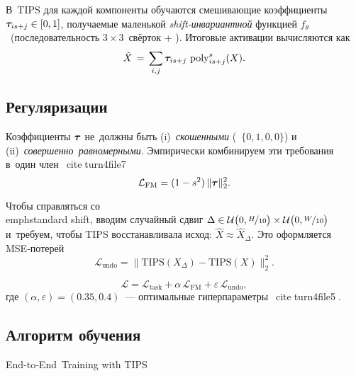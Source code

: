 В TIPS для каждой компоненты обучаются смешивающие коэффициенты
$\bm{\tau}_{is+j}\in[0,1]$, получаемые маленькой
\emph{shift‑инвариантной} функцией $f_{\theta}$ (последовательность
$3\times3$ свёрток + \relu).  Итоговые активации вычисляются как
\begin{equation}
  \hat X \,=\, \sum_{i,j} \bm{\tau}_{is+j}\,\operatorname{poly}_{i s + j}^{s}(X).\label{eq:tips_output}
\end{equation}

\subsection{Регуляризации}
Коэффициенты $\bm{\tau}$ не должны быть (i)~\emph{скошенными}
(\eg~$\{0,1,0,0\}$) и (ii)~\emph{совершенно равномерными}.  Эмпирически
комбинируем эти требования в один член citeturn4file7
\begin{equation}
  \mathcal L_{\text{FM}} = (1-s^2)\,\|\bm{\tau}\|_2^2.\label{eq:lfm}
\end{equation}

Чтобы справляться со \\emph{standard shift}, вводим случайный сдвиг
$\Delta\in\mathcal U\bigl(0,\nicefrac{H}{10}\bigr)\times\mathcal U\bigl(0,\nicefrac{W}{10}\bigr)$
и требуем, чтобы TIPS восстанавливала исход: $\hat X\approx \hat X_{\!\Delta}$.
Это оформляется MSE‑потерей
\begin{equation}
  \mathcal L_{\text{undo}} = \bigl\|\text{TIPS}(X_{\!\Delta})-\text{TIPS}(X)\bigr\|_2^2.\label{eq:lundo}
\end{equation}

\begin{equation}
 \mathcal L = \mathcal L_{\text{task}} + \alpha\,\mathcal L_{\text{FM}} + \varepsilon\,\mathcal L_{\text{undo}},\label{eq:total_loss}
\end{equation}
где $(\alpha,\varepsilon)=(0.35,0.4)$ — оптимальные гиперпараметры citeturn4file5.

\subsection{Алгоритм обучения}
\begin{algorithm*}[htb]
  \DontPrintSemicolon
  \caption{End‑to‑End Training with TIPS}\label{alg:tips}
\end{algorithm*}

